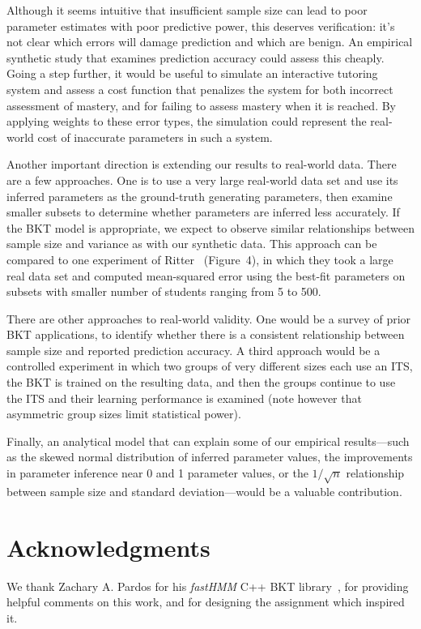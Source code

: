 \documentclass{edm_template}
\begin{document}
Although it seems intuitive that insufficient sample size can lead to poor parameter estimates with poor predictive power, this deserves verification: it's not clear which errors will damage prediction and which are benign. An empirical synthetic study that examines prediction accuracy could assess this cheaply. Going a step further, it would be useful to simulate an interactive tutoring system and assess a cost function that penalizes the system for both incorrect assessment of mastery, and for failing to assess mastery when it is reached. By applying weights to these error types, the simulation could represent the real-world cost of inaccurate parameters in such a system.

Another important direction is extending our results to real-world data. There are a few approaches. One is to use a very large real-world data set and use its inferred parameters as the ground-truth generating parameters, then examine smaller subsets to determine whether parameters are inferred less accurately. If the BKT model is appropriate, we expect to observe similar relationships between sample size and variance as with our synthetic data. This approach can be compared to one experiment of Ritter~\cite{ritter} (Figure~4), in which they took a large real data set and computed mean-squared error using the best-fit parameters on subsets with smaller number of students ranging from 5 to 500.

There are other approaches to real-world validity. One would be a survey of prior BKT applications, to identify whether there is a consistent relationship between sample size and reported prediction accuracy. A third approach would be a controlled experiment in which two groups of very different sizes each use an ITS, the BKT is trained on the resulting data, and then the groups continue to use the ITS and their learning performance is examined (note however that asymmetric group sizes limit statistical power).

Finally, an analytical model that can explain some of our empirical results---such as the skewed normal distribution of inferred parameter values, the improvements in parameter inference near 0 and 1 parameter values, or the $1/\sqrt{n}$ relationship between sample size and standard deviation---would be a valuable contribution.

\section{Acknowledgments}
We thank Zachary A. Pardos for his \emph{fastHMM} C++ BKT library~\cite{pardosjohnson}, for providing helpful comments on this work, and for designing the assignment which inspired it.



\end{document}
